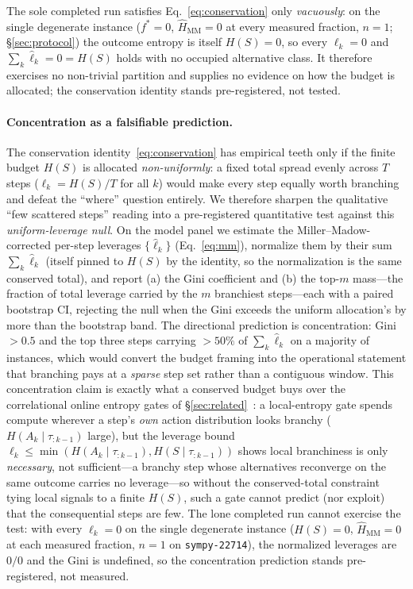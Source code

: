 \documentclass[11pt]{article}
\newcommand{\strat}{S}
\begin{document}
The sole completed run satisfies Eq.~\eqref{eq:conservation} only \emph{vacuously}:
on the single degenerate instance ($f^\ast=0$, $\widehat{H}_{\mathrm{MM}}=0$ at
every measured fraction, $n\!=\!1$; \S\ref{sec:protocol}) the outcome entropy is
itself $H(\strat)=0$, so every $\ell_k=0$ and $\sum_k\widehat\ell_k=0=H(\strat)$
holds with no occupied alternative class. It therefore exercises no non-trivial
partition and supplies no evidence on how the budget is allocated; the conservation
identity stands pre-registered, not tested.

\paragraph{Concentration as a falsifiable prediction.}
The conservation identity~\eqref{eq:conservation} has empirical teeth only if the
finite budget $H(\strat)$ is allocated \emph{non-uniformly}: a fixed total spread
evenly across $T$ steps ($\ell_k=H(\strat)/T$ for all $k$) would make every step
equally worth branching and defeat the ``where'' question entirely. We therefore
sharpen the qualitative ``few scattered steps'' reading into a pre-registered
quantitative test against this \emph{uniform-leverage null}. On the model panel we
estimate the Miller--Madow-corrected per-step leverages $\{\widehat\ell_k\}$
(Eq.~\eqref{eq:mm}), normalize them by their sum $\sum_k\widehat\ell_k$ (itself
pinned to $H(\strat)$ by the identity, so the normalization is the same conserved
total), and report (a) the Gini coefficient and (b) the top-$m$ mass---the fraction
of total leverage carried by the $m$ branchiest steps---each with a paired bootstrap
CI, rejecting the null when the Gini exceeds the uniform allocation's by more than the
bootstrap band. The directional prediction is concentration: Gini${}>0.5$ and the top
three steps carrying ${>}50\%$ of $\sum_k\widehat\ell_k$ on a majority of instances,
which would convert the budget framing into the operational statement that branching
pays at a \emph{sparse} step set rather than a contiguous window. This concentration
claim is exactly what a conserved budget buys over the correlational online entropy
gates of \S\ref{sec:related}~\citep{egb2025}: a local-entropy gate spends compute
wherever a step's \emph{own} action distribution looks branchy
($H(A_k\mid\tau_{:k-1})$ large), but the leverage bound
$\ell_k\le\min(H(A_k\mid\tau_{:k-1}),H(\strat\mid\tau_{:k-1}))$ shows local
branchiness is only \emph{necessary}, not sufficient---a branchy step whose
alternatives reconverge on the same outcome carries no leverage---so without the
conserved-total constraint tying local signals to a finite $H(\strat)$, such a gate
cannot predict (nor exploit) that the consequential steps are few. The lone completed
run cannot exercise the test: with every $\ell_k=0$ on the single degenerate instance
($H(\strat)=0$, $\widehat{H}_{\mathrm{MM}}=0$ at each measured fraction, $n\!=\!1$ on
\texttt{sympy-22714}), the normalized leverages are $0/0$ and the Gini is undefined,
so the concentration prediction stands pre-registered, not measured.
\end{document}
